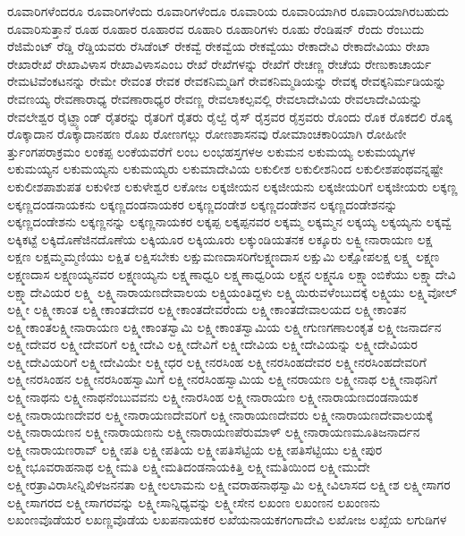 {ರೂವಾರಿಗಳೆಂದರೂ
ರೂವಾರಿಗಳೆಂದು
ರೂವಾರಿಗಳೆಂದೂ
ರೂವಾರಿಯ
ರೂವಾರಿಯಾಗಿರ
ರೂವಾರಿಯಾಗಿರಬಹುದು
ರೂವಾರಿಸುತ್ತಾನೆ
ರೂಹ
ರೂಹಾರ
ರೂಹಾರವ
ರೂಹಾರಿ
ರೂಹಾರಿಗಳು
ರೂಹು
ರೆಂಡಿಷನ್
ರೆಂದು
ರೆಂಬುದು
ರೆಜಿಮೆಂಟ್
ರೆಡ್ಡಿ
ರೆಡ್ಡಿಯವರು
ರೆಸಿಡೆಂಟ್
ರೇಕವ್ವೆ
ರೇಕವ್ವೆಯ
ರೇಕವ್ವೆಯು
ರೇಕಾದೇವಿ
ರೇಕಾದೇವಿಯು
ರೇಖಾ
ರೇಖಾರೇಖೆ
ರೇಖಾವಿಳಾಸ
ರೇಖಾವಿಳಾಸಎಂಬ
ರೇಖೆ
ರೇಖೆಗಳನ್ನು
ರೇಖೆಗೆ
ರೇಚಣ್ಣ
ರೇಚೆಯ
ರೇಣುಕಾಚಾರ್ಯ
ರೇಮಟಿವೆಂಕಟನನ್ನು
ರೇಮೇ
ರೇವಂತ
ರೇವಕ
ರೇವಕನಿಮ್ಮಡಿಗೆ
ರೇವಕನಿಮ್ಮಡಿಯನ್ನು
ರೇವಕ್ಕ
ರೇವಕ್ಕನಿರ್ಮಡಿಯನ್ನು
ರೇವಣಯ್ಯ
ರೇವಣಾರಾಧ್ಯ
ರೇವಣಾರಾಧ್ಯರ
ರೇವಣ್ಣ
ರೇವಲಾಕಲ್ಪವಲ್ಲಿ
ರೇವಲಾದೇವಿಯ
ರೇವಲಾದೇವಿಯನ್ನು
ರೇವಲೇಶ್ವರ
ರೈಟ್ಹ್ಯಾಂಡ್
ರೈತರನ್ನು
ರೈತರಿಗೆ
ರೈತರು
ರೈಲ್ವೆ
ರೈಸ್
ರೈಸ್ರವರ
ರೈಸ್ರವರು
ರೊಂದು
ರೊಕ
ರೊಕದಲಿ
ರೊಕ್ಕ
ರೊಕ್ಕಾದಾನ
ರೊಕ್ಕಾದಾನಹಣ
ರೊಖ
ರೋಣಗಲ್ಲು
ರೋಣಶಾಸನವು
ರೋಮಾಂಚಕಾರಿಯಾಗಿ
ರೋಹಿಣೀ
ರ್ತ್ತುಂಗಪರಾಕ್ರಮಂ
ಲಂಕಪ್ಪ
ಲಂಕೆಯವರೆಗೆ
ಲಂಬ
ಲಂಭಹಸ್ತಗಳಅ
ಲಕುಮನ
ಲಕುಮಯ್ಯ
ಲಕುಮಯ್ಯಗಳ
ಲಕುಮಯ್ಯನ
ಲಕುಮಯ್ಯನು
ಲಕುಮಯ್ಯರು
ಲಕುಮಾದೇವಿಯ
ಲಕುಲೀಶ
ಲಕುಲೀಶನಿಂದ
ಲಕುಲೀಶಪಂಥವನ್ನಷ್ಟೇ
ಲಕುಲೀಶಪಾಶುಪತ
ಲಕುಳೀಶ
ಲಕುಳೇಶ್ವರ
ಲಕೋಜ
ಲಕ್ಕಜೀಯನ
ಲಕ್ಕಜೀಯನು
ಲಕ್ಕಜೀಯರಿಗೆ
ಲಕ್ಕಜೀಯರು
ಲಕ್ಕಣ್ಣ
ಲಕ್ಕಣ್ಣದಂಡನಾಯಕನು
ಲಕ್ಕಣ್ಣದಂಡನಾಯಕರ
ಲಕ್ಕಣ್ಣದಂಡೇಶ
ಲಕ್ಕಣ್ಣದಂಡೇಶನ
ಲಕ್ಕಣ್ಣದಂಡೇಶನನ್ನು
ಲಕ್ಕಣ್ಣದಂಡೇಶನು
ಲಕ್ಕಣ್ಣನನ್ನು
ಲಕ್ಕಣ್ಣನಾಯಕರ
ಲಕ್ಕಪ್ಪ
ಲಕ್ಕಪ್ಪನವರ
ಲಕ್ಕಮ್ಮ
ಲಕ್ಕಮ್ಮನ
ಲಕ್ಕಯ್ಯ
ಲಕ್ಕಯ್ಯನು
ಲಕ್ಕವ್ವೆ
ಲಕ್ಕಿಕಟ್ಟೆ
ಲಕ್ಕಿದೊಣೆಜಿನದೊಣೆಯ
ಲಕ್ಕಿಯೂರ
ಲಕ್ಕಿಯೂರು
ಲಕ್ಕುಂಡಿಯತನಕ
ಲಕ್ಕೂರು
ಲಕ್ವ್ಮೀನಾರಾಯಣ
ಲಕ್ಷ
ಲಕ್ಷಣ
ಲಕ್ಷಮ್ಮಮ್ಮಣಿಯು
ಲಕ್ಷಿತ
ಲಕ್ಷಿಸಬೇಕು
ಲಕ್ಷುಮಣದಾಸರಿಗೆಲಕ್ಷ್ಮಣದಾಸ
ಲಕ್ಷುಮಿ
ಲಕ್ಷೋಪಲಕ್ಷ
ಲಕ್ಷ್ಮ
ಲಕ್ಷ್ಮಣ
ಲಕ್ಷ್ಮಣದಾಸ
ಲಕ್ಷ್ಮಣಯ್ಯನವರ
ಲಕ್ಷ್ಮಣಯ್ಯನು
ಲಕ್ಷ್ಮಣಾಧ್ವರಿ
ಲಕ್ಷ್ಮಣಾಧ್ವರಿಯ
ಲಕ್ಷ್ಮನ
ಲಕ್ಷ್ಮನೂ
ಲಕ್ಷ್ಮಾಂಬಿಕೆಯು
ಲಕ್ಷ್ಮಾದೇವಿ
ಲಕ್ಷ್ಮಾದೇವಿಯರ
ಲಕ್ಷ್ಮಿ
ಲಕ್ಷ್ಮಿನಾರಾಯಣದೇವಾಲಯ
ಲಕ್ಷ್ಮಿಯಂತಿದ್ದಳು
ಲಕ್ಷ್ಮಿಯಿರುವಳೆಂಬುದಕ್ಕೆ
ಲಕ್ಷ್ಮಿಯು
ಲಕ್ಷ್ಮಿವೋಲ್
ಲಕ್ಷ್ಮೀ
ಲಕ್ಷ್ಮೀಕಾಂತ
ಲಕ್ಷ್ಮೀಕಾಂತದೇವರ
ಲಕ್ಷ್ಮೀಕಾಂತದೇವರೆಂದು
ಲಕ್ಷ್ಮೀಕಾಂತದೇವಾಲಯದ
ಲಕ್ಷ್ಮೀಕಾಂತನ
ಲಕ್ಷ್ಮೀಕಾಂತಲಕ್ಷ್ಮೀನಾರಾಯಣ
ಲಕ್ಷ್ಮೀಕಾಂತಸ್ವಾಮಿ
ಲಕ್ಷ್ಮೀಕಾಂತಸ್ವಾಮಿಯ
ಲಕ್ಷ್ಮೀಗುಣಗಣಾಲಂಕೃತ
ಲಕ್ಷ್ಮೀಜನಾರ್ದನ
ಲಕ್ಷ್ಮೀದೇವರ
ಲಕ್ಷ್ಮೀದೇವರಿಗೆ
ಲಕ್ಷ್ಮೀದೇವಿ
ಲಕ್ಷ್ಮೀದೇವಿಗೆ
ಲಕ್ಷ್ಮೀದೇವಿಯ
ಲಕ್ಷ್ಮೀದೇವಿಯನ್ನು
ಲಕ್ಷ್ಮೀದೇವಿಯರ
ಲಕ್ಷ್ಮೀದೇವಿಯರಿಗೆ
ಲಕ್ಷ್ಮೀದೇವಿಯೇ
ಲಕ್ಷ್ಮೀಧರ
ಲಕ್ಷ್ಮೀನರಸಿಂಹ
ಲಕ್ಷ್ಮೀನರಸಿಂಹದೇವರ
ಲಕ್ಷ್ಮೀನರಸಿಂಹದೇವರಿಗೆ
ಲಕ್ಷ್ಮೀನರಸಿಂಹನ
ಲಕ್ಷ್ಮೀನರಸಿಂಹಸ್ವಾಮಿಗೆ
ಲಕ್ಷ್ಮೀನರಸಿಂಹಸ್ವಾಮಿಯ
ಲಕ್ಷ್ಮೀನರಾಯಣ
ಲಕ್ಷ್ಮೀನಾಥ
ಲಕ್ಷ್ಮೀನಾಥನಿಗೆ
ಲಕ್ಷ್ಮೀನಾಥನು
ಲಕ್ಷ್ಮೀನಾಥನೆಂಬುವವನು
ಲಕ್ಷ್ಮೀನಾರಸಿಂಹ
ಲಕ್ಷ್ಮೀನಾರಾಯಣ
ಲಕ್ಷ್ಮೀನಾರಾಯಣದಂಡನಾಯಕ
ಲಕ್ಷ್ಮೀನಾರಾಯಣದೇವರ
ಲಕ್ಷ್ಮೀನಾರಾಯಣದೇವರಿಗೆ
ಲಕ್ಷ್ಮೀನಾರಾಯಣದೇವರು
ಲಕ್ಷ್ಮೀನಾರಾಯಣದೇವಾಲಯಕ್ಕೆ
ಲಕ್ಷ್ಮೀನಾರಾಯಣನ
ಲಕ್ಷ್ಮೀನಾರಾಯಣನು
ಲಕ್ಷ್ಮೀನಾರಾಯಣಪೆರುಮಾಳ್
ಲಕ್ಷ್ಮೀನಾರಾಯಣಮೂತಿಜನಾರ್ದನ
ಲಕ್ಷ್ಮೀನಾರಾಯಣರಾವ್
ಲಕ್ಷ್ಮೀಪತಿ
ಲಕ್ಷ್ಮೀಪತಿಯ
ಲಕ್ಷ್ಮೀಪತಿಸೆಟ್ಟಿಯ
ಲಕ್ಷ್ಮೀಪತಿಸೆಟ್ಟಿಯು
ಲಕ್ಷ್ಮೀಪುರ
ಲಕ್ಷ್ಮೀಭೂವರಾಹನಾಥ
ಲಕ್ಷ್ಮೀಮತಿ
ಲಕ್ಷ್ಮೀಮತಿದಂಡನಾಯಕಿತ್ತಿ
ಲಕ್ಷ್ಮೀಮತಿಯಿಂದ
ಲಕ್ಷ್ಮೀಮುದೇ
ಲಕ್ಷ್ಮೀರತ್ರಾವಿರಾಸೀನ್ನಿಖಿಳಜನನತಾ
ಲಕ್ಷ್ಮೀಲಲಾಮನು
ಲಕ್ಷ್ಮೀವರಾಹನಾಥಸ್ವಾಮಿ
ಲಕ್ಷ್ಮೀವಿಲಾಸದ
ಲಕ್ಷ್ಮೀಶ
ಲಕ್ಷ್ಮೀಸಾಗರ
ಲಕ್ಷ್ಮೀಸಾಗರದ
ಲಕ್ಷ್ಮೀಸಾಗರವನ್ನು
ಲಕ್ಷ್ಮೀಸಾನ್ನಿಧ್ಯವನ್ನು
ಲಕ್ಷ್ಮೀಸೇನ
ಲಖಂಣ
ಲಖಂಣನ
ಲಖಂಣನು
ಲಖಂಣವೊಡೆಯರ
ಲಖಣ್ಣವೊಡೆಯ
ಲಖಪನಾಯಕರ
ಲಖೆಯನಾಯಕಗಂಗಾದೇವಿ
ಲಖೋಜ
ಲಖ್ಖೆಯ
ಲಗುಡಿಗಳ
}
